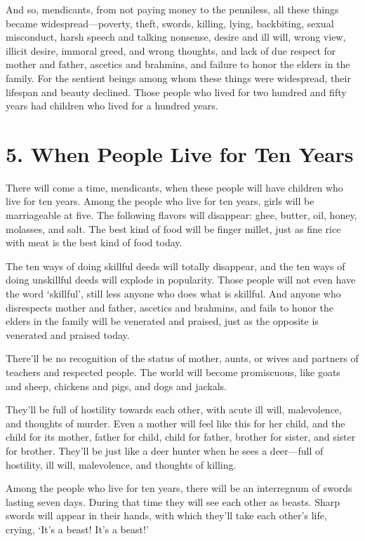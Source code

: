 \documentclass[12pt,openany]{book}%
\begin{document}
And so, mendicants, from not paying money to the penniless, all these things became widespread—poverty, theft, swords, killing, lying, backbiting, sexual misconduct, harsh speech and talking nonsense, desire and ill will, wrong view, illicit desire, immoral greed, and wrong thoughts, and lack of due respect for mother and father, ascetics and brahmins, and failure to honor the elders in the family. For the sentient beings among whom these things were widespread, their lifespan and beauty declined. Those people who lived for two hundred and fifty years had children who lived for a hundred years. 

\section*{5. When People Live for Ten Years }

There will come a time, mendicants, when these people will have children who live for ten years. Among the people who live for ten years, girls will be marriageable at five. The following flavors will disappear: ghee, butter, oil, honey, molasses, and salt. The best kind of food will be finger millet, just as fine rice with meat is the best kind of food today. 

The ten ways of doing skillful deeds will totally disappear, and the ten ways of doing unskillful deeds will explode in popularity. Those people will not even have the word ‘skillful’, still less anyone who does what is skillful. And anyone who disrespects mother and father, ascetics and brahmins, and fails to honor the elders in the family will be venerated and praised, just as the opposite is venerated and praised today. 

There’ll be no recognition of the status of mother, aunts, or wives and partners of teachers and respected people. The world will become promiscuous, like goats and sheep, chickens and pigs, and dogs and jackals. 

They’ll be full of hostility towards each other, with acute ill will, malevolence, and thoughts of murder. Even a mother will feel like this for her child, and the child for its mother, father for child, child for father, brother for sister, and sister for brother. They’ll be just like a deer hunter when he sees a deer—full of hostility, ill will, malevolence, and thoughts of killing. 

Among the people who live for ten years, there will be an interregnum of swords lasting seven days. During that time they will see each other as beasts. Sharp swords will appear in their hands, with which they’ll take each other’s life, crying, ‘It’s a beast! It’s a beast!’ 
\end{document}
